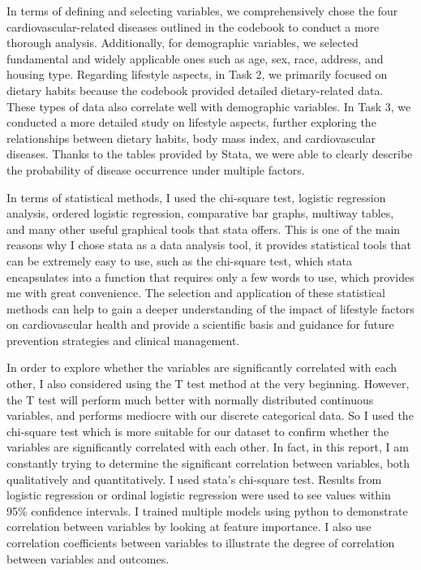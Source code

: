 \documentclass{article}
\begin{document}
In terms of defining and selecting variables, we comprehensively chose the four cardiovascular-related diseases outlined in the codebook to conduct a more thorough analysis. Additionally, for demographic variables, we selected fundamental and widely applicable ones such as age, sex, race, address, and housing type. Regarding lifestyle aspects, in Task 2, we primarily focused on dietary habits because the codebook provided detailed dietary-related data. These types of data also correlate well with demographic variables. In Task 3, we conducted a more detailed study on lifestyle aspects, further exploring the relationships between dietary habits, body mass index, and cardiovascular diseases. Thanks to the tables provided by Stata, we were able to clearly describe the probability of disease occurrence under multiple factors.

In terms of statistical methods, I used the chi-square test, logistic regression analysis, ordered logistic regression, comparative bar graphs, multiway tables, and many other useful graphical tools that stata offers. This is one of the main reasons why I chose stata as a data analysis tool, it provides statistical tools that can be extremely easy to use, such as the chi-square test, which stata encapsulates into a function that requires only a few words to use, which provides me with great convenience. The selection and application of these statistical methods can help to gain a deeper understanding of the impact of lifestyle factors on cardiovascular health and provide a scientific basis and guidance for future prevention strategies and clinical management.

In order to explore whether the variables are significantly correlated with each other, I also considered using the T test method at the very beginning. However, the T test will perform much better with normally distributed continuous variables, and performs mediocre with our discrete categorical data. So I used the chi-square test which is more suitable for our dataset to confirm whether the variables are significantly correlated with each other. In fact, in this report, I am constantly trying to determine the significant correlation between variables, both qualitatively and quantitatively. I used stata's chi-square test. Results from logistic regression or ordinal logistic regression were used to see values within 95\% confidence intervals. I trained multiple models using python to demonstrate correlation between variables by looking at feature importance. I also use correlation coefficients between variables to illustrate the degree of correlation between variables and outcomes.
\end{document}
